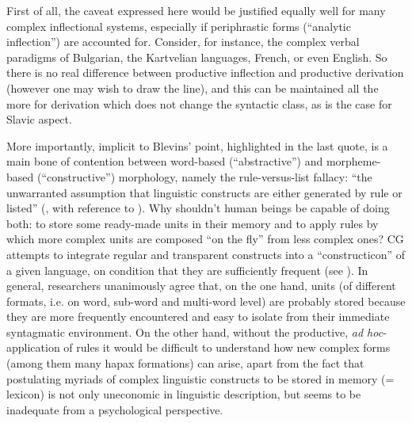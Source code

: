 \documentclass[output=paper]{langscibook}
\begin{document}
First of all, the caveat expressed here would be justified equally well for many complex inflectional systems, especially if periphrastic forms (“analytic inflection”) are accounted for. Consider, for instance, the complex verbal paradigms of Bulgarian, the Kartvelian languages, French, or even English. So there is no real difference between productive inflection and productive derivation (however one may wish to draw the line), and this can be maintained all the more for derivation which does not change the syntactic class, as is the case for Slavic aspect.

More importantly, implicit to Blevins’ point, highlighted in the last quote, is a main bone of contention between word-based (“abstractive”) and morpheme-based (“constructive”) morphology, namely the rule-versus-list fallacy: “the unwarranted assumption that linguistic constructs are either generated by rule or listed” (\citealt[4]{Booij2010}, with reference to \citealt{Langacker1987}). Why shouldn't human beings be capable of doing both: to store some ready-made units in their memory and to apply rules by which more complex units are composed “on the fly” from less complex ones? CG attempts to integrate regular and transparent constructs into a ``constructicon'' of a given language, on condition that they are sufficiently frequent (see ). In general, researchers unanimously agree that, on the one hand, units (of different formats, i.e. on word, sub-word and multi-word level) are probably stored because they are more frequently encountered and easy to isolate from their immediate syntagmatic environment. On the other hand, without the productive, \textit{ad hoc}{}-application of rules it would be difficult to understand how new complex forms (among them many hapax formations) can arise, apart from the fact that postulating myriads of complex linguistic constructs to be stored in memory (= lexicon) is not only uneconomic in linguistic description, but seems to be inadequate from a psychological perspective.
\end{document}
